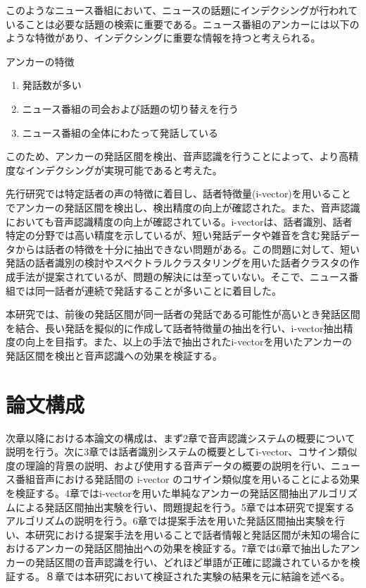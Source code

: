 このようなニュース番組において、ニュースの話題にインデクシングが行われていることは必要な話題の検索に重要である。ニュース番組のアンカーには以下のような特徴があり、インデクシングに重要な情報を持つと考えられる。\newline

アンカーの特徴
\begin{enumerate}
\item 発話数が多い
\item ニュース番組の司会および話題の切り替えを行う
\item ニュース番組の全体にわたって発話している
\end{enumerate}\par

このため、アンカーの発話区間を検出、音声認識を行うことによって、より高精度なインデクシングが実現可能であると考えた。\par
先行研究では特定話者の声の特徴に着目し、話者特徴量(i-vector)を用いることでアンカーの発話区間を検出し、検出精度の向上が確認された。また、音声認識においても音声認識精度の向上が確認されている。i-vectorは、話者識別、話者特定の分野では高い精度を示しているが、短い発話データや雑音を含む発話データからは話者の特徴を十分に抽出できない問題がある。この問題に対して、短い発話の話者識別の検討\cite{panaiv}やスペクトラルクラスタリングを用いた話者クラスタの作成手法\cite{spectroclus}が提案されているが、問題の解決には至っていない。そこで、ニュース番組では同一話者が連続で発話することが多いことに着目した。\par
本研究では、前後の発話区間が同一話者の発話である可能性が高いとき発話区間を結合、長い発話を擬似的に作成して話者特徴量の抽出を行い、i-vector抽出精度の向上を目指す。また、以上の手法で抽出されたi-vectorを用いたアンカーの発話区間を検出と音声認識への効果を検証する。

\section{論文構成}
次章以降における本論文の構成は、まず2章で音声認識システムの概要について説明を行う。次に3章では話者識別システムの概要としてi-vector、コサイン類似度の理論的背景の説明、および使用する音声データの概要の説明を行い、ニュース番組音声における発話間の i-vector のコサイン類似度を用いることによる効果を検証する。4章ではi-vectorを用いた単純なアンカーの発話区間抽出アルゴリズムによる発話区間抽出実験を行い、問題提起を行う。5章では本研究で提案するアルゴリズムの説明を行う。6章では提案手法を用いた発話区間抽出実験を行い、本研究における提案手法を用いることで話者情報と発話区間が未知の場合におけるアンカーの発話区間抽出への効果を検証する。7章では6章で抽出したアンカーの発話区間の音声認識を行い、どれほど単語が正確に認識されているかを検証する。８章では本研究において検証された実験の結果を元に結論を述べる。

